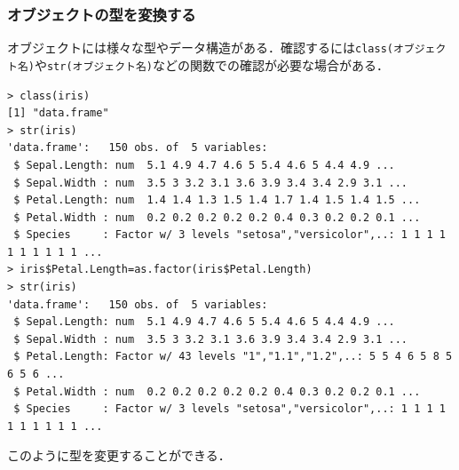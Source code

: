 \documentclass[a4paper,10pt,fleqn]{jarticle}
\begin{document}
\subsubsection{オブジェクトの型を変換する}
オブジェクトには様々な型やデータ構造がある．確認するには\verb+class(オブジェクト名)+や\verb+str(オブジェクト名)+などの関数での確認が必要な場合がある．
\begin{breakbox}
\begin{verbatim}
> class(iris)
[1] "data.frame"
> str(iris)
'data.frame':   150 obs. of  5 variables:
 $ Sepal.Length: num  5.1 4.9 4.7 4.6 5 5.4 4.6 5 4.4 4.9 ...
 $ Sepal.Width : num  3.5 3 3.2 3.1 3.6 3.9 3.4 3.4 2.9 3.1 ...
 $ Petal.Length: num  1.4 1.4 1.3 1.5 1.4 1.7 1.4 1.5 1.4 1.5 ...
 $ Petal.Width : num  0.2 0.2 0.2 0.2 0.2 0.4 0.3 0.2 0.2 0.1 ...
 $ Species     : Factor w/ 3 levels "setosa","versicolor",..: 1 1 1 1 1 1 1 1 1 1 ...
> iris$Petal.Length=as.factor(iris$Petal.Length)
> str(iris)
'data.frame':   150 obs. of  5 variables:
 $ Sepal.Length: num  5.1 4.9 4.7 4.6 5 5.4 4.6 5 4.4 4.9 ...
 $ Sepal.Width : num  3.5 3 3.2 3.1 3.6 3.9 3.4 3.4 2.9 3.1 ...
 $ Petal.Length: Factor w/ 43 levels "1","1.1","1.2",..: 5 5 4 6 5 8 5 6 5 6 ...
 $ Petal.Width : num  0.2 0.2 0.2 0.2 0.2 0.4 0.3 0.2 0.2 0.1 ...
 $ Species     : Factor w/ 3 levels "setosa","versicolor",..: 1 1 1 1 1 1 1 1 1 1 ...
\end{verbatim}
\end{breakbox}
このように型を変更することができる．
\end{document}
